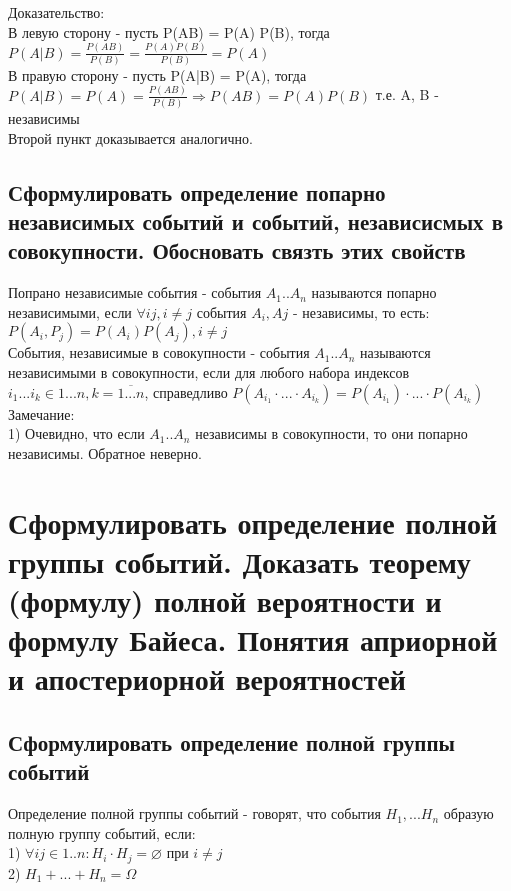Доказательство:\\
В левую сторону - пусть P(AB) = P(A) P(B), тогда $P(A|B) = \frac{P(AB)}{P(B)} = \frac{P(A)P(B)}{P(B)} = P(A)$\\
В правую сторону - пусть P(A|B) = P(A), тогда $P(A|B) = P(A) = \frac{P(AB)}{P(B)} \Rightarrow P(AB) = P(A) P(B)$ т.е. A, B - независимы\\

Второй пункт доказывается аналогично.

\subsection{Сформулировать определение попарно независимых событий и событий, независисмых в совокупности. Обосновать связть этих свойств}
Попрано независимые события - события $A_{1} .. A_{n}$ называются попарно независимыми, если $\forall ij, i \neq j$ события $A_{i}, A{j}$ - независимы, то есть: $P(A_{i}, P_{j}) = P(A_{i}) P(A_{j}), i \neq j$\\

События, независимые в совокупности - события $A_{1} .. A_{n}$ называются независимыми в совокупности, если для любого набора индексов $i_{1} ... i_{k} \in {1 ... n}, k = \overline{1 ... n}$, справедливо $P(A_{i_{1}} \cdot ... \cdot A_{i_{k}}) = P(A_{i_{1}}) \cdot ... \cdot P(A_{i_{k}})$\\

Замечание:\\
1) Очевидно, что если $A_{1} .. A_{n}$ независимы в совокупности, то они попарно независимы. Обратное неверно. 

\section{Сформулировать определение полной группы событий. Доказать теорему (формулу) полной вероятности и формулу Байеса. Понятия априорной и апостериорной вероятностей}

\subsection{Сформулировать определение полной группы событий}
Определение полной группы событий - говорят, что события $H_{1}, ... H_{n}$ образую полную группу событий, если:\\
1) $\forall ij \in {1 .. n}: H_{i} \cdot H_{j} = \varnothing$ при $i \neq j$\\
2) $H_{1} + ... + H_{n} = \Omega$\\

